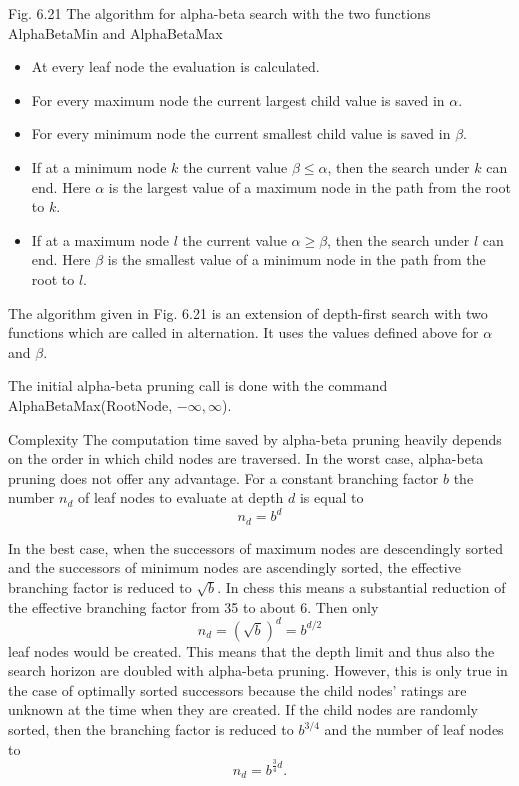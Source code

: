 \documentclass[10pt]{book}
\begin{document}
Fig. 6.21 The algorithm for alpha-beta search with the two functions AlphaBetaMin and AlphaBetaMax

\begin{itemize}
  \item At every leaf node the evaluation is calculated.
  \item For every maximum node the current largest child value is saved in $\alpha$.
  \item For every minimum node the current smallest child value is saved in $\beta$.
  \item If at a minimum node $k$ the current value $\beta \leq \alpha$, then the search under $k$ can end. Here $\alpha$ is the largest value of a maximum node in the path from the root to $k$.
  \item If at a maximum node $l$ the current value $\alpha \geq \beta$, then the search under $l$ can end. Here $\beta$ is the smallest value of a minimum node in the path from the root to $l$.
\end{itemize}
The algorithm given in Fig. 6.21 is an extension of depth-first search with two functions which are called in alternation. It uses the values defined above for $\alpha$ and $\beta$.

The initial alpha-beta pruning call is done with the command AlphaBetaMax(RootNode, $-\infty, \infty$).

Complexity The computation time saved by alpha-beta pruning heavily depends on the order in which child nodes are traversed. In the worst case, alpha-beta pruning does not offer any advantage. For a constant branching factor $b$ the number $n_{d}$ of leaf nodes to evaluate at depth $d$ is equal to
$$
n_{d}=b^{d}
$$

In the best case, when the successors of maximum nodes are descendingly sorted and the successors of minimum nodes are ascendingly sorted, the effective branching factor is reduced to $\sqrt{b}$. In chess this means a substantial reduction of the effective branching factor from 35 to about 6. Then only
$$
n_{d}=\left(\sqrt{b}\right)^{d}=b^{d / 2}
$$
leaf nodes would be created. This means that the depth limit and thus also the search horizon are doubled with alpha-beta pruning. However, this is only true in the case of optimally sorted successors because the child nodes' ratings are unknown at the time when they are created. If the child nodes are randomly sorted, then the branching factor is reduced to $b^{3 / 4}$ and the number of leaf nodes to
$$
n_{d}=b^{\frac{3}{4} d}.
$$
\end{document}
